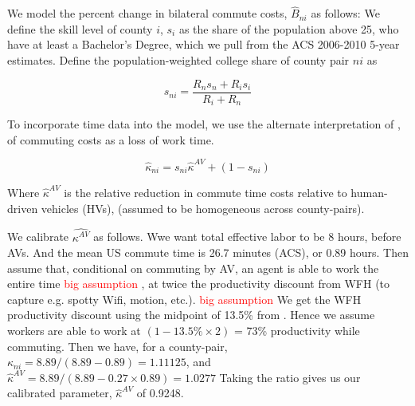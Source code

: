 \documentclass{article}
\begin{document}
We model the percent change in bilateral commute costs, $\hat B_{ni}$ as follows:
We define the skill level of county $i$, $s_i$ as the share of the population above 25, who have at least a Bachelor's Degree, which we pull from the ACS 2006-2010 5-year estimates.
Define the population-weighted college share of county pair $ni$ as 

$$s_{ni} = \frac{R_n s_n + R_i s_i}{R_i + R_n} $$



To incorporate time data into the model, we use the alternate interpretation of \citep{monte_commuting_2018}, of commuting costs as a loss of work time.



$$\hat \kappa_{ni} =  s_{ni} \hat{\kappa}^{AV} + (1-s_{ni})$$

Where $ \hat{\kappa}^{AV}$ is the relative reduction in commute time costs relative to human-driven vehicles (HVs), (assumed to be homogeneous across county-pairs).




We calibrate $\hat {\kappa^{AV}}$ as follows.
Wwe want total effective labor to be 8 hours, before AVs. And the mean US commute time is 26.7 minutes (ACS), or 0.89 hours. 
Then assume that, conditional on commuting by AV, an agent is able to work the entire time  \textcolor{red}{big assumption }, at twice the productivity discount from WFH (to capture e.g. spotty Wifi, motion, etc.). \textcolor{red}{big assumption}
We get the WFH productivity discount using the midpoint of 13.5\% from \cite{gibbs_et_al_2023}.
Hence we assume workers are able to work at $(1-13.5\% \times 2)$ = 73\% productivity while commuting. 
Then we have, for a county-pair, $\kappa_{ni} = 8.89/(8.89-0.89) = 1.11125$, and $\hat \kappa^{AV} = 8.89 / (8.89 - 0.27 \times 0.89 ) = 1.0277$
Taking the ratio gives us our calibrated parameter, $\hat \kappa^{AV}$ of 0.9248.%

 
\end{document}
